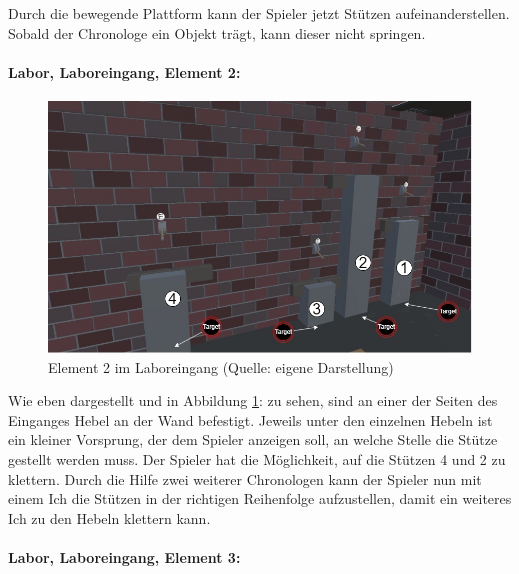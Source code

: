 Durch die bewegende Plattform kann der Spieler jetzt Stützen aufeinanderstellen. Sobald der Chronologe ein Objekt trägt, kann dieser nicht springen.

\paragraph{Labor, Laboreingang, Element 2:}\label{p:lle2}

\begin{figure}[ht]
\centering
\includegraphics[width=0.8\linewidth]{content/pictures/Raetsel-L02_R02_R02.jpg}
\caption{Element 2 im Laboreingang (Quelle: eigene Darstellung)}
\label{fig:L02_R02_R02}
\end{figure}

Wie eben dargestellt und in Abbildung \ref{fig:L02_R02_R02}:  zu sehen, sind an einer der Seiten des Einganges Hebel an der Wand befestigt. Jeweils unter den einzelnen Hebeln ist ein kleiner Vorsprung, der dem Spieler anzeigen soll, an welche Stelle die Stütze gestellt werden muss. Der Spieler hat die Möglichkeit, auf die Stützen 4 und 2 zu klettern. Durch die Hilfe zwei weiterer Chronologen kann der Spieler nun mit einem Ich die Stützen in der richtigen Reihenfolge aufzustellen, damit ein weiteres Ich zu den Hebeln klettern kann.

\paragraph{Labor, Laboreingang, Element 3:}\label{p:lle3}

